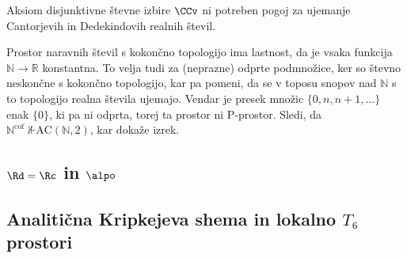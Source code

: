 \begin{izrek}
  Aksiom disjunktivne števne izbire \(\CCv\) ni potreben pogoj za ujemanje
  Cantorjevih in Dedekindovih realnih števil.
\end{izrek}
\begin{dokaz}
  Prostor naravnih števil s kokončno topologijo ima lastnost, da je vsaka
  funkcija \(ℕ → ℝ\) konstantna. To velja tudi za (neprazne) odprte podmnožice,
  ker so števno neskončne s kokončno topologijo, kar pa pomeni, da se v toposu
  snopov nad \(ℕ\) s to topologijo realna števila ujemajo. Vendar je presek
  množic \(\{0, n, n+1, …\} \) enak \(\{0\}\), ki pa ni odprta, torej ta prostor
  ni P-prostor. Sledi, da \({ℕ^{\text{cof}}~\not⊩ \mathrm{AC}(ℕ, 2)}\), kar
  dokaže izrek.
\end{dokaz}


\subsection{\(\Rd = \Rc\) in \(\alpo\)}
\subsection{Analitična Kripkejeva shema in lokalno \(T₆\) prostori}


